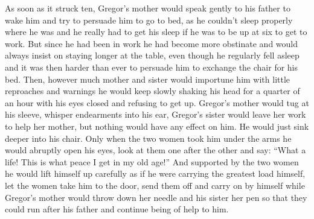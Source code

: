 As soon as it struck ten, Gregor’s mother would speak gently to his
father to wake him and try to persuade him to go to bed, as he couldn’t
sleep properly where he was and he really had to get his sleep if he
was to be up at six to get to work. But since he had been in work he
had become more obstinate and would always insist on staying longer at
the table, even though he regularly fell asleep and it was then harder
than ever to persuade him to exchange the chair for his bed. Then,
however much mother and sister would importune him with little
reproaches and warnings he would keep slowly shaking his head for a
quarter of an hour with his eyes closed and refusing to get up.
Gregor’s mother would tug at his sleeve, whisper endearments into his
ear, Gregor’s sister would leave her work to help her mother, but
nothing would have any effect on him. He would just sink deeper into
his chair. Only when the two women took him under the arms he would
abruptly open his eyes, look at them one after the other and say: “What
a life! This is what peace I get in my old age!” And supported by the
two women he would lift himself up carefully as if he were carrying the
greatest load himself, let the women take him to the door, send them
off and carry on by himself while Gregor’s mother would throw down her
needle and his sister her pen so that they could run after his father
and continue being of help to him.

